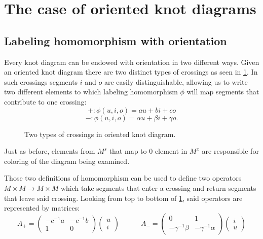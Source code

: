 \section{The case of oriented knot diagrams}

\subsection{Labeling homomorphism with orientation}

Every knot diagram can be endowed with orientation in two different ways. Given an oriented knot diagram there are two distinct types of crossings as seen in \cref{fig:4:two:types:crossings}. In such crossings segments $i$ and $o$ are easily distinguishable, allowing us to write two different elements to which labeling homomorphism $\phi$ will map segments that contribute to one crossing:
$$+:\phi(u,i,o)=au+bi+co$$
$$-:\phi(u,i,o)=\alpha u+\beta i+\gamma o.$$

\begin{figure}[h]\centering
  \caption{\label{fig:4:two:types:crossings}Two types of crossings in oriented knot diagram.}
\end{figure}

Just as before, elements from $M^s$ that map to $0$ element in $M^x$ are responsible for coloring of the diagram being examined.

Those two definitions of homomorphism can be used to define two operators $M\times M\to M\times M$ which take segments that enter a crossing and return segments that leave said crossing. Looking from top to bottom of \cref{fig:4:two:types:crossings}, said operators are represented by matrices:
$$
A_+=\begin{pmatrix}
  -c^{-1}a & -c^{-1}b \\
  1 & 0
\end{pmatrix}
\begin{pmatrix}u\\i\end{pmatrix}
\quad\quad\quad
A_-=\begin{pmatrix}
  0 & 1 \\ 
  -\gamma^{-1}\beta & -\gamma^{-1}\alpha
\end{pmatrix}
\begin{pmatrix}i\\u\end{pmatrix}
$$
